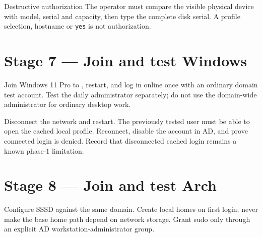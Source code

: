 \begin{gate}{Destructive authorization}
The operator must compare the visible physical device with model, serial and
capacity, then type the complete disk serial. A profile selection, hostname or
\texttt{yes} is not authorization.
\end{gate}




\section{Stage 7 --- Join and test Windows}

Join Windows 11 Pro to , restart, and log in online once
with an ordinary domain test account. Test the daily administrator separately;
do not use the domain-wide administrator for ordinary desktop work.


Disconnect the network and restart. The previously tested user must be able to
open the cached local profile. Reconnect, disable the account in AD, and prove
connected login is denied. Record that disconnected cached login remains a
known phase-1 limitation.

\section{Stage 8 --- Join and test Arch}

Configure SSSD against the same domain. Create local homes on first login;
never make the base home path depend on network storage. Grant sudo only
through an explicit AD workstation-administrator group.


